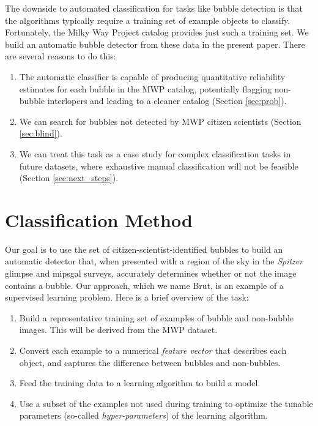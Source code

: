 The downside to automated classification for tasks like bubble detection is that the algorithms typically require a training set of example objects to classify. Fortunately, the Milky Way Project catalog provides just such a training set. We build an automatic bubble detector from these data in the present paper. There are several reasons to do this:

\begin{enumerate}
\item The automatic classifier is capable of producing quantitative reliability estimates for each bubble in the MWP catalog, potentially flagging non-bubble interlopers and leading to a cleaner catalog (Section \ref{sec:prob}).

\item We can search for bubbles not detected by MWP citizen scientists (Section \ref{sec:blind}).

\item We can treat this task as a case study for complex classification tasks in future datasets, where exhaustive manual classification will not be feasible (Section \ref{sec:next_steps}).
\end{enumerate}

\section{Classification Method}
\label{sec:method}

Our goal is to use the set of citizen-scientist-identified bubbles to build an automatic detector that, when presented with a region of the sky in the  \textit{Spitzer} {\sc glimpse} and {\sc mipsgal} surveys, accurately determines whether or not the image contains a bubble. Our approach, which we name Brut, is an example of a supervised learning problem. Here is a brief overview of the task:

\begin{enumerate}
\item Build a representative training set of examples of bubble and non-bubble images. This will be derived from the MWP dataset.
\item Convert each example to a numerical \textit{feature vector} that describes each object, and captures the difference between bubbles and non-bubbles.
\item Feed the training data to a learning algorithm to build a model.
\item Use a subset of the examples not used during training to optimize the tunable parameters (so-called \textit{hyper-parameters}) of the learning algorithm.
\end{enumerate}


